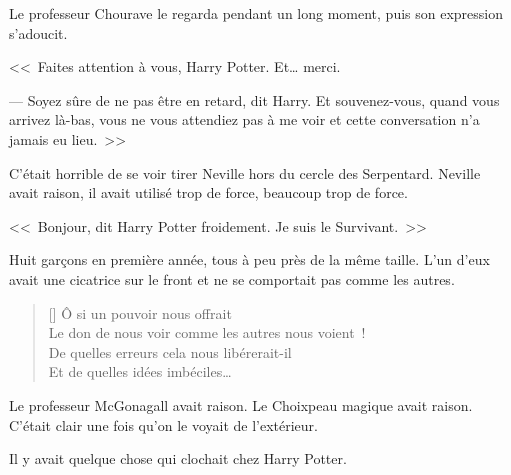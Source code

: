 Le professeur Chourave le regarda pendant un long moment, puis son expression s'adoucit.

<<~Faites attention à vous, Harry Potter. Et… merci.

--- Soyez sûre de ne pas être en retard, dit Harry. Et souvenez-vous, quand vous arrivez là-bas, vous ne vous attendiez pas à me voir et cette conversation n'a jamais eu lieu.~>>

\later

C'était horrible de se voir tirer Neville hors du cercle des Serpentard. Neville avait raison, il avait utilisé trop de force, beaucoup trop de force.

<<~Bonjour, dit Harry Potter froidement. Je suis le Survivant.~>>

Huit garçons en première année, tous à peu près de la même taille. L'un d'eux avait une cicatrice sur le front et ne se comportait pas comme les autres.

\baselineskip\settowidth{\versewidth}{Le don de nous voir comme les autres nous voient~!} \begin{verse}[\versewidth] Ô si un pouvoir nous offrait\\ Le don de nous voir comme les autres nous voient~!\\ De quelles erreurs cela nous libérerait-il\\ Et de quelles idées imbéciles… \end{verse}

Le professeur McGonagall avait raison. Le Choixpeau magique avait raison. C'était clair une fois qu'on le voyait de l'extérieur.

Il y avait quelque chose qui clochait chez Harry Potter.~
